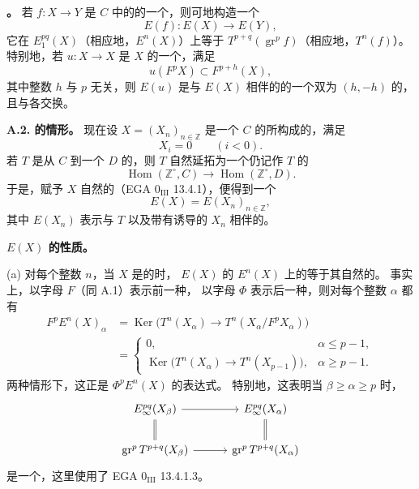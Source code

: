 \textbf{。} 若 $f:X\to Y$ 是 $C$ 中的的一个，则可地构造一个
\[
E(f):E(X)\longrightarrow E(Y),
\]
它在 $E_1^{pq}(X)$（相应地，$E^n(X)$）上等于 $T^{p+q}(\operatorname{gr}^p f)$（相应地，$T^n(f)$）。
特别地，若 $u:X\to X$ 是 $X$ 的一个，满足
\[
u(F^pX)\subset F^{p+h}(X),
\]
其中整数 $h$ 与 $p$ 无关，则 $E(u)$ 是与 $E(X)$ 相伴的的一个双为 $(h,-h)$ 的，且与各交换。

\textbf{A.2. 的情形。} 现在设 $X=(X_n)_{n\in\mathbb Z}$ 是一个 $C$ 的所构成的，满足
\[
X_i=0\qquad(i<0).
\]
若 $T$ 是从 $C$ 到一个 $D$ 的，则 $T$ 自然延拓为一个仍记作 $T$ 的
\[
\operatorname{Hom}(\mathbb Z^\circ,C)\longrightarrow\operatorname{Hom}(\mathbb Z^\circ,D).
\]
于是，赋予 $X$ 自然的（EGA $0_{\mathrm{III}}$ 13.4.1），便得到一个
\[
E(X)=E(X_n)_{n\in\mathbb Z},
\]
其中 $E(X_n)$ 表示与 $T$ 以及带有诱导的 $X_n$ 相伴的。

\textbf{$E(X)$ 的性质。}

(a) 对每个整数 $n$，当 $X$ 是的时， $E(X)$ 的 $E^n(X)$ 上的等于其自然的。
事实上，以字母 $F$（同 A.1）表示前一种，
以字母 $\Phi$ 表示后一种，则对每个整数 $\alpha$ 都有
\[
\begin{split}
F^pE^n(X)_\alpha
&=\operatorname{Ker}\bigl(T^n(X_\alpha)\longrightarrow T^n(X_\alpha/F^pX_\alpha)\bigr)\\
&=\begin{cases}
0,&\alpha\leq p-1,\\
\operatorname{Ker}\bigl(T^n(X_\alpha)\longrightarrow T^n(X_{p-1})\bigr),&\alpha\geq p-1.
\end{cases}
\end{split}
\]
两种情形下，这正是 $\Phi^pE^n(X)$ 的表达式。
特别地，这表明当 $\beta\geq\alpha\geq p$ 时，
\[
\begin{tikzcd}[column sep=3em]
E_\infty^{pq}(X_\beta)\arrow[r]\arrow[d,equal]&E_\infty^{pq}(X_\alpha)\arrow[d,equal]\\
\operatorname{gr}^p T^{p+q}(X_\beta)\arrow[r]&\operatorname{gr}^p T^{p+q}(X_\alpha)
\end{tikzcd}
\]
是一个，这里使用了 EGA $0_{\mathrm{III}}$ 13.4.1.3。

